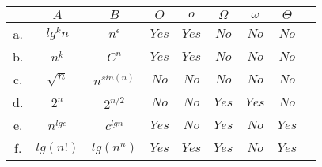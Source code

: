 \documentclass[10pt,letterpaper]{article}
\begin{document}
\begin{itemize}
{\begin{tabular}{ |c|c|c|c|c|c|c|c|c| }
  \hline
   & $A$ & $B$ & $O$ & $o$ & $\Omega$ & $\omega$ & $\Theta$ \\
  \hline
  a. & $lg^kn$ & $n^\epsilon$  &$Yes$   &$Yes$   &$No$   &$No$   &$No$  \\ 
  \hline
  b. & $n^k$ & $C^n$  &$Yes$  &$Yes$  &$No$  &$No$  &$No$  \\ 
  \hline
  c.  & $\sqrt{n}$ & $n^{sin(n)}$  &$No$  &$No$  &$No$  &$No$  &$No$  \\ 
  \hline
  d. & $2^n$ & $2^{n/2}$  &$No$  &$No$  &$Yes$  &$Yes$  &$No$  \\ 
  \hline
  e. & $n^{lgc}$ & $c^{lgn}$ &$Yes$  &$No$  &$Yes$  &$No$  &$Yes$  \\ 
  \hline
  f. & $lg(n!)$ & $lg(n^n)$ &$Yes$  &$Yes$  &$Yes$  &$No$  &$Yes$  \\ 
  \hline
\end{tabular}}
\label{}
\end{itemize}


\newpage
\end{document}
